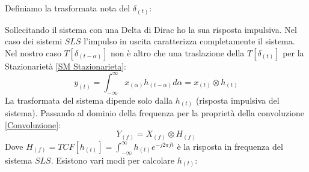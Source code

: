         Definiamo la trasformata nota del $\delta_{(t)}$:
        \begin{figure}[H]
            \centering 
        \label{Def impulso}
        \end{figure}
        Sollecitando il sistema con una Delta di Dirac ho la sua risposta impulsiva. Nel caso dei sistemi $SLS$ l'impulso
        in uscita caratterizza completamente il sistema. Nel nostro caso $T[\delta_{(t-\alpha)}]$ non è altro che una traslazione della $T[\delta_{(t)}]$ per la 
        Stazionarietà \ref*{SM Stazionarieta}: 
        \[
            y_{(t)} =\int_{-\infty}^{\infty}x_{(\alpha)}h_{(t-\alpha)}d\alpha = x_{(t)}\otimes h_{(t)} 
        \]
        La trasformata del sistema dipende solo dalla $h_{(t)}$ (risposta impulsiva del sistema). Passando al dominio della frequenza per la proprietà della convoluzione \ref{Convoluzione}:
        \[
            Y_{(f)} =X_{(f)}\otimes H_{(f)} 
        \]
        Dove $H_{(f)} = TCF[h_{(t)}] = \int_{-\infty}^{\infty} h_{(t)}e^{-j2\pi ft}$ è la risposta in frequenza del sistema $SLS$. Esistono vari modi
        per calcolare $h_{(t)}$:
